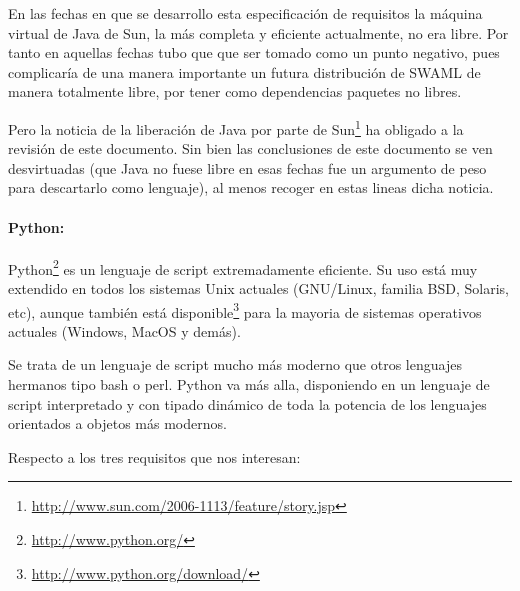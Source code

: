 En las fechas en que se desarrollo esta especificación de requisitos la máquina virtual
de Java de Sun, la más completa y eficiente actualmente, no era libre. Por tanto en 
aquellas fechas tubo que que ser tomado como un punto negativo, pues complicaría de 
una manera importante un futura distribución de SWAML de manera totalmente libre,
por tener como dependencias paquetes no libres.

Pero la noticia de la liberación de Java por parte de Sun\footnote{\url{http://www.sun.com/2006-1113/feature/story.jsp}} ha obligado a la
revisión de este documento. Sin bien las conclusiones de este documento se ven 
desvirtuadas (que Java no fuese libre en esas fechas fue un argumento de peso para
descartarlo como lenguaje), al menos recoger en estas lineas dicha noticia.

\paragraph{Python:}Python\footnote{\url{http://www.python.org/}} es un lenguaje de 
script extremadamente eficiente. Su uso está muy extendido en todos los sistemas 
Unix actuales (GNU/Linux, familia BSD, Solaris, etc), aunque también está disponible\footnote{\url{http://www.python.org/download/}} para la mayoria de sistemas 
operativos actuales (Windows, MacOS y demás).

Se trata de un lenguaje de script mucho más moderno que otros lenguajes hermanos 
tipo bash o perl. Python va más alla, disponiendo en un lenguaje de script 
interpretado y con tipado dinámico de toda la potencia de los lenguajes orientados 
a objetos más modernos.

Respecto a los tres requisitos que nos interesan:

